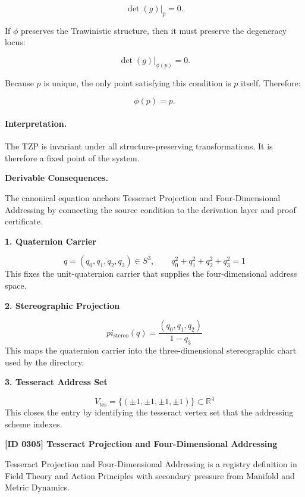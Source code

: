 \begin{equation}
\det(g)\big|_p=0 .
\end{equation}

If $\phi$ preserves the Trawinistic structure, then it must preserve the degeneracy locus:

\begin{equation}
\det(g)\big|_{\phi(p)}=0 .
\end{equation}

Because $p$ is unique, the only point satisfying this condition is $p$ itself. Therefore:

\begin{equation}
\phi(p)=p .
\end{equation}

\paragraph{Interpretation.}
The TZP is invariant under all structure-preserving transformations. It is therefore a fixed point of the system.

\par\vspace{0.35em}
\noindent\textbf{Derivable Consequences.}\quad
\begingroup
\footnotesize
\raggedright
The canonical equation anchors Tesseract Projection and Four-Dimensional Addressing by connecting the source condition to the derivation layer and proof certificate.
\par\endgroup

\noindent\textbf{1. Quaternion Carrier}\par
\[
q=(q_0,q_1,q_2,q_3)\in S^3,\qquad q_0^2+q_1^2+q_2^2+q_3^2=1
\]
\noindent This fixes the unit-quaternion carrier that supplies the four-dimensional address space.\par
\noindent\textbf{2. Stereographic Projection}\par
\[
pi_{\mathrm{stereo}}(q)=\frac{(q_0,q_1,q_2)}{1-q_3}
\]
\noindent This maps the quaternion carrier into the three-dimensional stereographic chart used by the directory.\par
\noindent\textbf{3. Tesseract Address Set}\par
\[
V_{\mathrm{tes}}=\{(\pm1,\pm1,\pm1,\pm1)\}\subset \mathbb{R}^4
\]
\noindent This closes the entry by identifying the tesseract vertex set that the addressing scheme indexes.\par

\clearpage
\noindent\textbf{[ID 0305] Tesseract Projection and Four-Dimensional Addressing}\par
\vspace{0.35em}
\begingroup\small
{}
Tesseract Projection and Four-Dimensional Addressing is a registry definition in Field Theory and Action Principles with secondary pressure from Manifold and Metric Dynamics.

